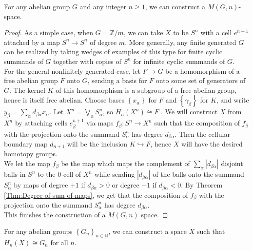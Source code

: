 \begin{lemma}\label{Moore-space-existence}
    For any abelian group $G$ and any integer $n\ge 1$,
    we can construct a $M(G,n)$-space.
\end{lemma}

\begin{proof}
As a simple case, when $G = \mathbb{Z} / m$, we can
take $X$ to be $S^{n}$ with a cell $e^{n+1}$ attached
by a map $S^{n} \to S^{n}$ of degree $m$. More
generally, any finite generated $G$ can be realized
by taking wedges of examples of this type for finite cyclic
summands of $G$ together with copies of $S^{n}$ for
infinite cyclic summands of $G$.\\
\linebreak
For the general nonfinitely generated case, let
$F \to G$ be a homomorphism of a free abelian group
$F$ onto $G$, sending a basis for $F$ onto some
set of generators of $G$. The kernel $K$ of this
homomorphism is a subgroup of a free abelian group, hence
is itself free abelian. Choose
bases $\left\{ x_{\alpha} \right\} $ for $F$ and
$\left\{ \gamma_{\beta} \right\} $ for $K$, and
write $y_{\beta} = \sum_{\alpha} d_{\beta \alpha} x_{\alpha}$.
Let $X^{n} = \bigvee_{\alpha} S_{\alpha}^{n}$, so
$H_n \left( X^{n} \right) \cong F$ . We will construct
$X$ from $X^{n}$ by attaching cells $e_{\beta}^{n+1}$ 
via maps $f_{\beta} \colon S^{n} \to X^{n}$ such that the
composition of $f_{\beta}$ with the projection onto the
summand $S_{\alpha}^{n}$ has degree $d_{\beta \alpha}$. Then
the cellular boundary map $d_{n+1}$ will be the inclusion
$K \hookrightarrow F$, hence $X$ will have the desired
homotopy groups.\\

We let the map $f_{\beta}$ be the
map which maps the complement of
$\sum_{\alpha} \left| d_{\beta \alpha} \right| $ 
disjoint balls in $S^{n}$ to the $0$-cell of $X^{n}$ while
sending $\left| d_{\beta \alpha} \right| $ of the
balls onto the summand $S_{\alpha}^{n}$ by maps of degree
$+1$ if $d_{\beta \alpha}> 0$ or degree
$-1$ if $d_{\beta \alpha}<0$.
By Theorem \ref{Thm:Degree-of-sum-of-maps}, we get
that the composition of
$f_{\beta}$ with the projection onto
the summand $S_{\alpha}^{n}$ has degree
$d_{\beta \alpha}$.\\
This finishes the construction of  a $M(G,n)$ space.
\end{proof}

\begin{corollary}
    For any abelian groups 
    $\left\{ G_{n} \right\}_{n \in \mathbb{N} }$, we
    can construct a space $X$ such that
    $H_n \left( X \right) \cong G_n$ for all $n$.
\end{corollary}

